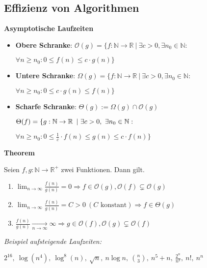 \begin{sectionbox}
\subsection{Effizienz von Algorithmen}\smallskip

\textbf{Asymptotische Laufzeiten}\par
\begin{itemize}
    \item \textbf{Obere Schranke}: $\mathcal{O}(g)=\{f:\mathbb{N} \rightarrow \mathbb{R}\ |\ \exists c>0, \exists n_{0} \in \mathbb{N}:$\par $\forall n \geq n_{0}: 0 \leq f(n) \leq c \cdot g(n)\}$
    \item \textbf{Untere Schranke}: $\Omega(g)=\{f: \mathbb{N} \rightarrow \mathbb{R}\ |\ \exists c>0, \exists n_{0} \in \mathbb{N}:$ \par $\forall n \geq n_{0}: 0 \leq c \cdot g(n) \leq f(n)\}$
    \item \textbf{Scharfe Schranke}: $\Theta(g):=\Omega(g) \cap \mathcal{O}(g)$\par
    $\Theta(f) = \{  g: \N \rightarrow \R\ |\ \exists c>0,\ \exists n_0 \in \N:$\par $\forall n \geq n_0: 0 \leq \frac1c \cdot f(n)\leq g(n) \leq c \cdot f(n)\}$
\end{itemize}\par\smallskip

\begin{greenbox}
\textbf{Theorem}\par
Seien $f, g: \mathbb{N} \rightarrow \mathbb{R}^{+}$ zwei Funktionen. Dann gilt.
\begin{enumerate}
    \item $\lim _{n \rightarrow \infty} \frac{f(n)}{g(n)}=0 \Rightarrow f \in \mathcal{O}(g), \mathcal{O}(f) \subsetneq \mathcal{O}(g)$
    \item $\lim _{n \rightarrow \infty} \frac{f(n)}{g(n)}=C>0\ (C \text { konstant}) \Rightarrow f \in \Theta(g)$
    \item $\frac{f(n)}{g(n)} \underset{n \rightarrow \infty}{\longrightarrow} \infty \Rightarrow g \in \mathcal{O}(f), \mathcal{O}(g) \subsetneq \mathcal{O}(f)$
\end{enumerate}
\end{greenbox}\smallskip
\textit{Beispiel aufsteigende Laufzeiten:}\par
$ 2^{16},\ \log(n^4),\ \log^8(n),\ \sqrt{n},\ n\log n,\ \binom{n}{3},\ n^5+n,\ \frac{2^n}{n^2},\ n!,\ n^n$\par\smallskip


\end{sectionbox}
